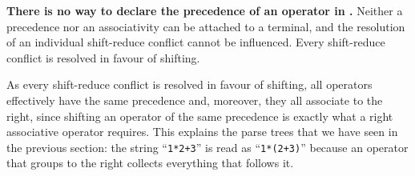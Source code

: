 \begin{tcolorbox}[
  enhanced,                      %
  width=0.95\textwidth,          %
  center,                        %
  colback=yellow!20,             %
  colframe=blue,                 %
  boxrule=1pt,                   %
  borderline={1pt}{3pt}{blue},   %
  sharp corners,                 %
  top=0.5cm,                     %
  bottom=0.5cm,                  %
  left=0.5cm,                    %
  right=0.5cm,                   %
  boxsep=0pt                     %
]
  \textbf{There is no way to declare the precedence of an operator in .}
  Neither a precedence nor an associativity can be attached to a terminal, and the resolution of an
  individual shift-reduce conflict cannot be influenced. Every shift-reduce conflict is resolved in favour
  of shifting.
\end{tcolorbox}

\noindent
As every shift-reduce conflict is resolved in favour of shifting, all operators effectively have the same
precedence and, moreover, they all associate to the right, since shifting an operator of the same precedence
is exactly what a right associative operator requires.  This explains the parse trees that we have seen in the
previous section: the string ``\texttt{1*2+3}'' is read as ``\texttt{1*(2+3)}'' because an operator
that groups to the right collects everything that follows it.

